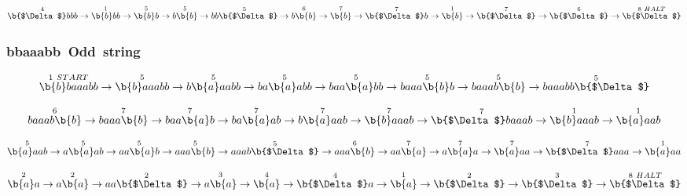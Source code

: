 \documentclass[12pt]{article}
\begin{document}
\[
\overset{4}{\b{$\Delta$}bbb}\rightarrow
\overset{1}{\b{b}bb}\rightarrow
\overset{5}{\b{b}b}\rightarrow
 \overset{5}{b\b{b}}\rightarrow
\overset{5}{bb\b{$\Delta$}}\rightarrow
\overset{6}{b\b{b}}\rightarrow
\overset{7}{\b{b}}\rightarrow
\overset{7}{\b{$\Delta$}b}\rightarrow
\overset{1}{\b{b}}\rightarrow
\overset{7}{\b{$\Delta$}}\rightarrow
\overset{6}{\b{$\Delta$}}\rightarrow
\overset{8~HALT}{\b{$\Delta$}}
\]
\subsubsection{bbaaabb~Odd~string}
\[
\overset{1~START}{\b{b}baaabb}\rightarrow
\overset{5}{\b{b}aaabb}\rightarrow
\overset{5}{b\b{a}aabb}\rightarrow
\overset{5}{ba\b{a}abb}\rightarrow
\overset{5}{baa\b{a}bb}\rightarrow
\overset{5}{baaa\b{b}b}\rightarrow
\overset{5}{baaab\b{b}}\rightarrow
\overset{5}{baaabb\b{$\Delta$} }\]

\[
\overset{6}{baaab\b{b}}\rightarrow
\overset{7}{baaa\b{b}}\rightarrow
\overset{7}{baa\b{a}b}\rightarrow
\overset{7}{ba\b{a}ab}\rightarrow
\overset{7}{b\b{a}aab}\rightarrow
\overset{7}{\b{b}aaab}\rightarrow
\overset{7}{\b{$\Delta$}baaab}\rightarrow
\overset{1}{\b{b}aaab}\rightarrow
\overset{1}{\b{a}aab}
\]

\[
\overset{5}{\b{a}aab}\rightarrow
\overset{5}{a\b{a}ab}\rightarrow
\overset{5}{aa\b{a}b}\rightarrow
\overset{5}{aaa\b{b}}\rightarrow
\overset{5}{aaab\b{$\Delta$}}\rightarrow
\overset{6}{aaa\b{b}}\rightarrow
\overset{7}{aa\b{a}}\rightarrow
\overset{7}{a\b{a}a}\rightarrow
\overset{7}{\b{a}aa}\rightarrow
\overset{7}{\b{$\Delta$}aaa}\rightarrow
\overset{1}{\b{a}aa}
\]

\[
\overset{2}{\b{a}a}\rightarrow
\overset{2}{a\b{a}}\rightarrow
\overset{2}{aa\b{$\Delta$}}\rightarrow
\overset{3}{a\b{a}}\rightarrow
\overset{4}{\b{a}}\rightarrow
\overset{4}{\b{$\Delta$}a}\rightarrow
\overset{1}{\b{a}}\rightarrow
\overset{2}{\b{$\Delta$}}\rightarrow
\overset{3}{\b{$\Delta$}}\rightarrow
\overset{8~HALT}{\b{$\Delta$}}
\]
\end{document}
